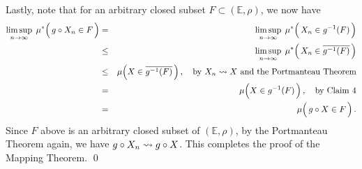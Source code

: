 \vskip 0.5cm
\noindent
Lastly, note that for an arbitrary closed subset $F \subset (\mathbb{E},\rho)$, we now have
\begin{eqnarray*}
\underset{n\rightarrow\infty}{\limsup}\;\, \mu^{*}\!\left(\,g \circ X_{n} \overset{{\color{white}.}}{\in} F\,\right)
&=&
	\underset{n\rightarrow\infty}{\limsup}\;\, \mu^{*}\!\left(\,X_{n} \overset{{\color{white}.}}{\in} g^{-1}(F)\,\right)
\\
&\leq&
	\underset{n\rightarrow\infty}{\limsup}\;\, \mu^{*}\!\left(\,X_{n} \overset{{\color{white}.}}{\in} \overline{g^{-1}(F)}\,\right)
\\
&\leq&
	\mu\!\left(X\overset{{\color{white}.}}{\in}\overline{g^{-1}(F)}\,\right),
	\quad\textnormal{by $X_{n} \wconverge X$ and the Portmanteau Theorem}
\\
&=&
	\mu\!\left(X\overset{{\color{white}.}}{\in}g^{-1}(F)\,\right),
	\quad\textnormal{by Claim 4}
\\
&=&
	\mu\!\left(\,g \circ X\overset{{\color{white}.}}{\in}F\,\right).
\end{eqnarray*}
Since $F$ above is an arbitrary closed subset of $(\mathbb{E},\rho)$,
by the Portmanteau Theorem again, we have \;$g \circ X_{n} \rightsquigarrow g \circ X$.
This completes the proof of the Mapping Theorem.
\qed


\renewcommand{\theenumi}{\roman{enumi}}
\renewcommand{\labelenumi}{\textnormal{(\theenumi)}$\;\;$}

